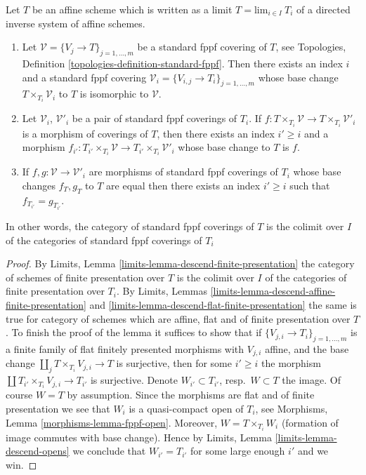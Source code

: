\begin{lemma}
\label{lemma-limit-fppf-topology}
Let $T$ be an affine scheme which is written as a limit
$T = \text{lim}_{i \in I}\ T_i$ of a directed inverse system of affine schemes.
\begin{enumerate}
\item Let $\mathcal{V} = \{V_j \to T\}_{j = 1, \ldots, m}$ be a standard fppf
covering of $T$, see
Topologies, Definition \ref{topologies-definition-standard-fppf}.
Then there exists an index $i$ and a standard fppf covering
$\mathcal{V}_i = \{V_{i, j} \to T_i\}_{j = 1, \ldots, m}$
whose base change $T \times_{T_i} \mathcal{V}_i$ to $T$
is isomorphic to $\mathcal{V}$.
\item Let $\mathcal{V}_i$, $\mathcal{V}'_i$ be a pair of standard
fppf coverings of $T_i$. If
$f : T \times_{T_i} \mathcal{V} \to T \times_{T_i} \mathcal{V}'_i$ is
a morphism of coverings of $T$, then there exists an index
$i' \geq i$ and a morphism
$f_{i'} : T_{i'} \times_{T_i} \mathcal{V} \to
T_{i'} \times_{T_i} \mathcal{V}'_i$
whose base change to $T$ is $f$.
\item If
$f, g : \mathcal{V} \to \mathcal{V}'_i$
are morphisms of standard fppf coverings of $T_i$ whose
base changes $f_T, g_T$ to $T$ are equal then there exists an
index $i' \geq i$ such that $f_{T_{i'}} = g_{T_{i'}}$.
\end{enumerate}
In other words, the category of standard fppf coverings of $T$ is
the colimit over $I$ of the categories of standard fppf coverings of $T_i$
\end{lemma}

\begin{proof}
By
Limits, Lemma \ref{limits-lemma-descend-finite-presentation}
the category of schemes of finite presentation over $T$ is the
colimit over $I$ of the categories of finite presentation over $T_i$. By
Limits, Lemmas \ref{limits-lemma-descend-affine-finite-presentation}
and \ref{limits-lemma-descend-flat-finite-presentation}
the same is true for category of schemes which are affine, flat and
of finite presentation over $T$.
To finish the proof of the lemma it suffices to show that if
$\{V_{j, i} \to T_i\}_{j = 1, \ldots, m}$ is a finite family of
flat finitely presented morphisms with $V_{j, i}$ affine, and the
base change $\coprod_j T \times_{T_i} V_{j, i} \to T$ is surjective,
then for some $i' \geq i$ the morphism
$\coprod T_{i'} \times_{T_i} V_{j, i} \to T_{i'}$ is surjective.
Denote $W_{i'} \subset T_{i'}$, resp.\ $W \subset T$ the image.
Of course $W = T$ by assumption.
Since the morphisms are flat and of finite presentation we see that
$W_i$ is a quasi-compact open of $T_i$, see
Morphisms, Lemma \ref{morphisms-lemma-fppf-open}.
Moreover, $W = T \times_{T_i} W_i$ (formation of image commutes
with base change). Hence by
Limits, Lemma \ref{limits-lemma-descend-opens}
we conclude that $W_{i'} = T_{i'}$ for some large enough $i'$
and we win.
\end{proof}

